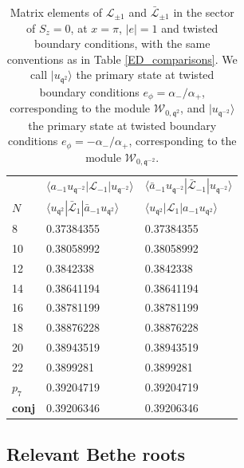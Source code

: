 \documentclass[a4paper,10pt]{article}
\newcommand{\q}{\mathfrak{q}}
\newcommand{\linnea}[1]{$\framebox{\tiny L}$\ \textbf{\texttt{{\color{red}\footnotesize#1}}}}
\newcommand{\jesper}[1]{$\framebox{\tiny J}$\ \textbf{\texttt{{\color{cyan}\footnotesize#1}}}}
\newcommand{\aSt}{\mathcal{W}}
\newcommand{\AStTL}[2]{\aSt_{#1,#2}}
\newcommand{\KSgen}{\mathcal{L}}
\begin{document}
\begin{table}[H]
\begin{minipage}{.5\textwidth}
\begin{tabular}{lll}
  \vspace*{5pt}     & $\langle a_{-1}u_{\q^{-2}} | {\mathcal L}_{-1} | u_{\q^{-2}} \rangle$  & $\langle \bar{a}_{-1}u_{\q^{-2}} |\bar{\mathcal L}_{-1}| u_{\q^{-2}} \rangle$   
   \\
     $N$   & $\langle u_{\q^2} |\bar{\mathcal L}_{1}| \bar{a}_{-1}u_{\q^2} \rangle$    & $\langle u_{\q^2}| {\mathcal L}_{1} | a_{-1}u_{\q^2} \rangle$   \\
\hline
8 & 0.37384355 & 0.37384355 \\
10 & 0.38058992 & 0.38058992 \\
12 & 0.3842338 & 0.3842338 \\
14 & 0.38641194 & 0.38641194 \\
16 & 0.38781199 & 0.38781199 \\
18 & 0.38876228 & 0.38876228 \\
20 & 0.38943519 & 0.38943519 \\
22 & 0.3899281 & 0.3899281 \\
$p_7$ & 0.39204719 & 0.39204719 \\
  \bf{conj}  & 0.39206346  & 0.39206346 \\
\hline
\end{tabular}
\end{minipage}
\caption{Matrix elements  of $\KSgen_{\pm 1}$ and $\bar{\KSgen}_{\pm 1}$ in the sector of $S_z=0$, at $x=\pi$, $|e| =  1$ and twisted boundary conditions, with the same conventions as in Table \ref{ED_comparisons}. We call $|u_{\q^2}\rangle$ the primary state at twisted boundary conditions $e_\phi=\alpha_{-}/\alpha_{+}$, corresponding to the module $\AStTL{0}{\q^{2}}$, and $|u_{\q^{-2}}\rangle$ the primary state at twisted boundary conditions $e_\phi=-\alpha_{-}/\alpha_{+}$, corresponding to the module $\AStTL{0}{\q^{-2}}$.
%
}\label{level1twisted}
\end{table}



\FloatBarrier

\newpage
\subsection{Relevant Bethe roots}\label{BetheRootAppendix}

\end{document}
